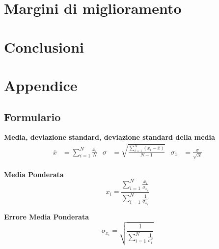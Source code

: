 \documentclass[a4paper,11pt,oneside]{article}
\begin{document}
\section{Margini di miglioramento}


\section{Conclusioni}

\section{Appendice}

\subsection{Formulario}
\textbf{Media, deviazione standard, deviazione standard della media}
\begin{align*}
        \overline{x}&=\sum\limits_{i=1}^{N} \frac{x_{i}}{N}&
        \sigma&=\sqrt{\frac{\sum\limits_{i=1}^{N} (x_{i}-\overline{x})}{N-1}}&
        \sigma_{\overline{x}}&=\frac{\sigma}{\sqrt{N}}
\end{align*}\\

\textbf{Media Ponderata}
\begin{equation*}
\label{eq:media_pond}
    x_i=\frac{\sum_{i=1}^{N}\frac{x_i}{\sigma_{x_i}}}{\sum_{i=1}^{N}\frac{1}{\sigma_{x_i}}}
\end{equation*}

\textbf{Errore Media Ponderata}
\begin{equation*}
\label{eq:errore_media_pond}
     \sigma_{x_i}=\sqrt{\frac{1}{\sum_{i=1}^{N}\frac{1}{\sigma_{i}^{2}}}}
\end{equation*}
\end{document}
